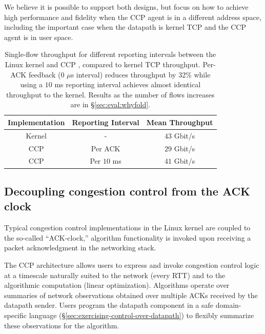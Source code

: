 We believe it is possible to support both designs, but focus on how to achieve high performance
and fidelity when the CCP agent is in a different address space, including the important
case when the datapath is kernel TCP and the CCP agent is in user space.




\begin{table}[]
    \centering
    \begin{tabular}{c|c|c}
        Implementation & Reporting Interval & Mean Throughput \\
        \hline
        Kernel & - & $43$ Gbit/s \\
        CCP & Per ACK & $29$ Gbit/s \\
        CCP & Per $10$ ms & $41$ Gbit/s \\
    \end{tabular}
    \caption{Single-flow throughput for different reporting intervals between
      the Linux kernel and CCP \userspace, compared to kernel TCP
      throughput. Per-ACK feedback (0 $\mu$s interval) reduces throughput by
      32\% while using a $10$ ms reporting interval
      achieves almost identical throughput to the kernel. Results as the number
      of flows  increases are in
      \S\ref{sec:eval:whyfold}.}\label{tab:perf:interval}
\end{table}

\subsection{Decoupling congestion control from the ACK clock}

Typical congestion control
implementations in the Linux kernel are coupled to the so-called ``ACK-clock,''
\ie algorithm functionality is invoked upon receiving a packet acknowledgment in
the networking stack.

The CCP architecture allows users to express and invoke congestion control logic at a timescale naturally suited to the network (\eg every RTT) and to the algorithmic computation (\eg linear optimization).
%
Algorithms operate over summaries of network observations obtained over multiple ACKs received by the datapath sender.
%
Users program the datapath component in a safe domain-specific language (\S\ref{sec:exercising-control-over-datapath}) to flexibly summarize these observations for the algorithm.

